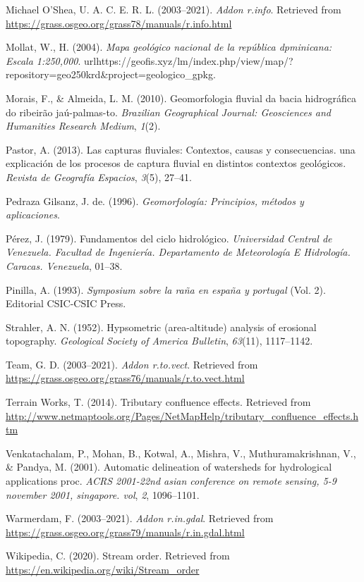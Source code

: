 \documentclass[11pt,]{article}
\begin{document}
\hypertarget{ref-rinfo}{}
Michael O'Shea, U. A. C. E. R. L. (2003--2021). \emph{Addon r.info}.
Retrieved from \url{https://grass.osgeo.org/grass78/manuals/r.info.html}

\hypertarget{ref-Mollat2004mapa}{}
Mollat, W., H. (2004). \emph{Mapa geológico nacional de la república
dpminicana: Escala 1:250,000}.
urlhttps://geofis.xyz/lm/index.php/view/map/?repository=geo250krd\&project=geologico\_gpkg.

\hypertarget{ref-morais2010geomorfologia}{}
Morais, F., \& Almeida, L. M. (2010). Geomorfologia fluvial da bacia
hidrográfica do ribeirão jaú-palmas-to. \emph{Brazilian Geographical
Journal: Geosciences and Humanities Research Medium}, \emph{1}(2).

\hypertarget{ref-pastor2013capturas}{}
Pastor, A. (2013). Las capturas fluviales: Contextos, causas y
consecuencias. una explicación de los procesos de captura fluvial en
distintos contextos geológicos. \emph{Revista de Geografía Espacios},
\emph{3}(5), 27--41.

\hypertarget{ref-pedraza1996geomorfologia}{}
Pedraza Gilsanz, J. de. (1996). \emph{Geomorfología: Principios, métodos
y aplicaciones}.

\hypertarget{ref-perez1979fundamentos}{}
Pérez, J. (1979). Fundamentos del ciclo hidrológico. \emph{Universidad
Central de Venezuela. Facultad de Ingeniería. Departamento de
Meteorología E Hidrología. Caracas. Venezuela}, 01--38.

\hypertarget{ref-pinilla1993symposium}{}
Pinilla, A. (1993). \emph{Symposium sobre la raña en españa y portugal}
(Vol. 2). Editorial CSIC-CSIC Press.

\hypertarget{ref-strahler1952hypsometric}{}
Strahler, A. N. (1952). Hypsometric (area-altitude) analysis of
erosional topography. \emph{Geological Society of America Bulletin},
\emph{63}(11), 1117--1142.

\hypertarget{ref-tovect}{}
Team, G. D. (2003--2021). \emph{Addon r.to.vect}. Retrieved from
\url{https://grass.osgeo.org/grass76/manuals/r.to.vect.html}

\hypertarget{ref-tributary}{}
Terrain Works, T. (2014). Tributary confluence effects. Retrieved from
\url{http://www.netmaptools.org/Pages/NetMapHelp/tributary_confluence_effects.htm}

\hypertarget{ref-venkatachalam2001automatic}{}
Venkatachalam, P., Mohan, B., Kotwal, A., Mishra, V., Muthuramakrishnan,
V., \& Pandya, M. (2001). Automatic delineation of watersheds for
hydrological applications proc. \emph{ACRS 2001-22nd asian conference on
remote sensing, 5-9 november 2001, singapore. vol}, \emph{2},
1096--1101.

\hypertarget{ref-ringdal}{}
Warmerdam, F. (2003--2021). \emph{Addon r.in.gdal}. Retrieved from
\url{https://grass.osgeo.org/grass79/manuals/r.in.gdal.html}

\hypertarget{ref-wikipedia2020stream}{}
Wikipedia, C. (2020). Stream order. Retrieved from
\url{https://en.wikipedia.org/wiki/Stream_order}




\newpage
\singlespacing 
\end{document}
